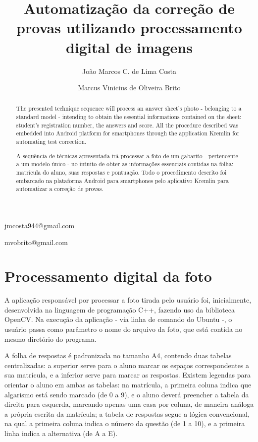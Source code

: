 \documentclass[conference,harvard,brazil,english]{sbatex}
\begin{document}
\title{Automatização da correção de provas utilizando processamento digital de imagens}
\author{João Marcos C. de Lima Costa}{jmcosta944@gmail.com}
\address{Universidade Federal do Rio Grande do Norte
\\Departamento de Engenharia Elétrica \\
Natal, RN, Brasil}
\author[1]{Marcus Vinicius de Oliveira Brito}{mvobrito@gmail.com}
\maketitle
{}
\begin{abstract}
The presented technique sequence will process an answer sheet's photo - belonging to a standard model - intending to obtain the essential informations contained on the sheet: student's registration number, the answers and score. All the procedure described was embedded into Android platform for smartphones through the application Kremlin for automating test correction.
\end{abstract}
\begin{abstract}
A sequência de técnicas apresentada irá processar a foto de um gabarito - pertencente a um modelo único - 
no intuito de obter as informações essenciais contidas na folha: matrícula do aluno, suas respostas e pontuação.
Todo o procedimento descrito foi embarcado na plataforma Android para smartphones pelo aplicativo Kremlin para automatizar a correção de provas.
\end{abstract}

\section{Processamento digital da foto}
	A aplicação responsável por processar a foto tirada pelo usuário foi, inicialmente, desenvolvida na linguagem de programação C++, fazendo uso da biblioteca OpenCV. 
	Na execução da aplicação - via linha de comando do Ubuntu -, o usuário passa como parâmetro o nome do arquivo da foto, que está contida no mesmo diretório do programa. 
	
	
	A folha de respostas é padronizada no tamanho A4, contendo duas tabelas centralizadas: a superior serve para o aluno marcar os espaços correspondentes a sua matrícula, e a inferior serve para marcar as respostas.
	Existem legendas para orientar o aluno em ambas as tabelas: na matrícula, a primeira coluna indica que algarismo está sendo marcado (de 0 a 9), e o aluno deverá preencher a tabela da direita para esquerda, marcando apenas uma casa por coluna, de maneira análoga a própria escrita da matrícula; a tabela de respostas segue a lógica convencional, na qual a primeira coluna indica o número da questão (de 1 a 10), e a primeira linha indica a alternativa (de A a E).
	
\end{document}
